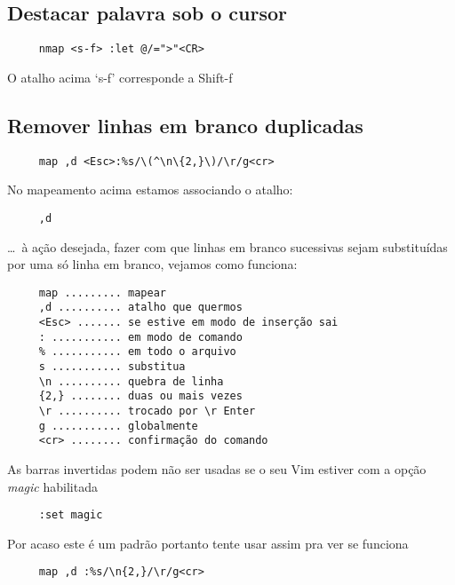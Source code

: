 \subsection{Destacar palavra sob o cursor }
\label{Destacar palavra sob o cursor }

\begin{verbatim}
     nmap <s-f> :let @/=">"<CR>
\end{verbatim}

O atalho acima `s-f' corresponde a Shift-f

\subsection{Remover linhas em branco duplicadas }
\label{Remover linhas em branco duplicadas }

\begin{verbatim}
     map ,d <Esc>:%s/\(^\n\{2,}\)/\r/g<cr>
\end{verbatim}

No mapeamento acima estamos associando o atalho:

\begin{verbatim}
     ,d
\end{verbatim}

\dots~à ação desejada, fazer com que linhas em branco sucessivas sejam
substituídas por uma só linha em branco, vejamos como funciona:

\begin{verbatim}
     map ......... mapear
     ,d .......... atalho que quermos
     <Esc> ....... se estive em modo de inserção sai
     : ........... em modo de comando
     % ........... em todo o arquivo
     s ........... substitua
     \n .......... quebra de linha
     {2,} ........ duas ou mais vezes
     \r .......... trocado por \r Enter
     g ........... globalmente
     <cr> ........ confirmação do comando
\end{verbatim}

As barras invertidas podem não ser usadas se o seu Vim estiver com a opção
{\em magic} habilitada

\begin{verbatim}
     :set magic
\end{verbatim}

Por acaso este é um padrão portanto tente usar assim pra ver se funciona

\begin{verbatim}
     map ,d :%s/\n{2,}/\r/g<cr>
\end{verbatim}

